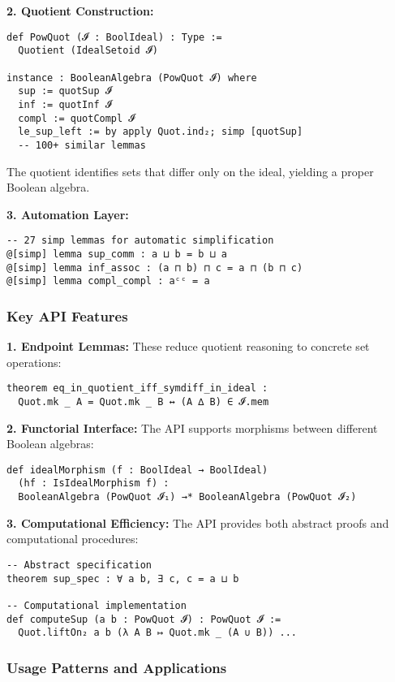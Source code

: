 \documentclass[11pt]{article}
\theoremstyle{plain}
\theoremstyle{definition}
\begin{document}
\textbf{2. Quotient Construction:}
\begin{verbatim}
def PowQuot (𝓘 : BoolIdeal) : Type :=
  Quotient (IdealSetoid 𝓘)

instance : BooleanAlgebra (PowQuot 𝓘) where
  sup := quotSup 𝓘
  inf := quotInf 𝓘
  compl := quotCompl 𝓘
  le_sup_left := by apply Quot.ind₂; simp [quotSup]
  -- 100+ similar lemmas
\end{verbatim}

The quotient identifies sets that differ only on the ideal, yielding a proper Boolean algebra.

\textbf{3. Automation Layer:}
\begin{verbatim}
-- 27 simp lemmas for automatic simplification
@[simp] lemma sup_comm : a ⊔ b = b ⊔ a
@[simp] lemma inf_assoc : (a ⊓ b) ⊓ c = a ⊓ (b ⊓ c)
@[simp] lemma compl_compl : aᶜᶜ = a
\end{verbatim}

\subsubsection{Key API Features}

\textbf{1. Endpoint Lemmas:} These reduce quotient reasoning to concrete set operations:
\begin{verbatim}
theorem eq_in_quotient_iff_symdiff_in_ideal :
  Quot.mk _ A = Quot.mk _ B ↔ (A ∆ B) ∈ 𝓘.mem
\end{verbatim}

\textbf{2. Functorial Interface:} The API supports morphisms between different Boolean algebras:
\begin{verbatim}
def idealMorphism (f : BoolIdeal → BoolIdeal) 
  (hf : IsIdealMorphism f) :
  BooleanAlgebra (PowQuot 𝓘₁) →* BooleanAlgebra (PowQuot 𝓘₂)
\end{verbatim}

\textbf{3. Computational Efficiency:} The API provides both abstract proofs and computational procedures:
\begin{verbatim}
-- Abstract specification
theorem sup_spec : ∀ a b, ∃ c, c = a ⊔ b

-- Computational implementation  
def computeSup (a b : PowQuot 𝓘) : PowQuot 𝓘 :=
  Quot.liftOn₂ a b (λ A B ↦ Quot.mk _ (A ∪ B)) ...
\end{verbatim}

\subsubsection{Usage Patterns and Applications}
\end{document}
